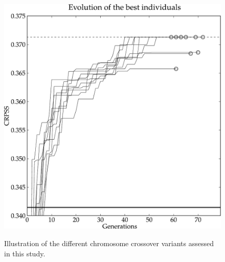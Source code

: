 \documentclass{ametsoc}
\begin{document}
\begin{figure}[t]
	\begin{center}
		\noindent\includegraphics[width=33pc,angle=0]{fig03.pdf}\\
	\end{center}
	\caption{Illustration of the different chromosome crossover variants assessed in this study.}
	\label{fig:illustration_crossover}
\end{figure}
\end{document}
